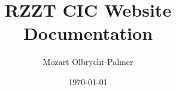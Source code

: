 \documentclass[a4paper,11pt]{book}
\begin{document}
\title{RZZT CIC Website Documentation}
\date{\today}
\author{Mozart Olbrycht-Palmer}
\maketitle

\tableofcontents












\end{document}

